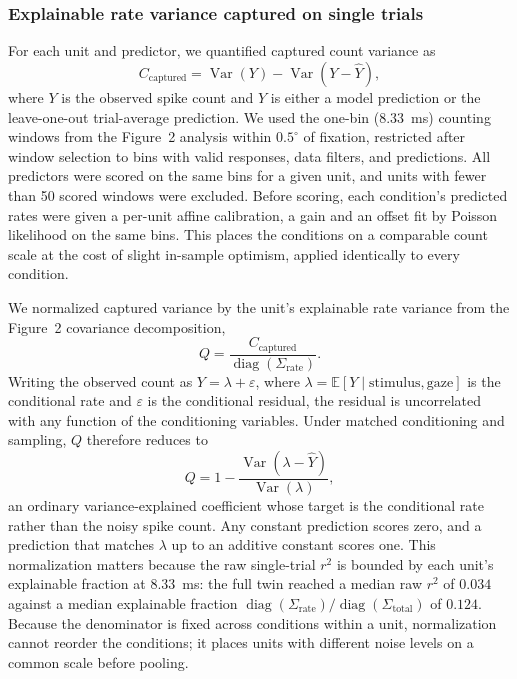 \documentclass{lite}
\begin{document}
\subsubsection{Explainable rate variance captured on single trials}
For each unit and predictor, we quantified captured count variance as
\begin{equation}
C_{\mathrm{captured}}
=
\operatorname{Var}(Y)-\operatorname{Var}(Y-\hat{Y}),
\end{equation}
where $Y$ is the observed spike count and $\hat{Y}$ is either a model prediction or the leave-one-out trial-average prediction. We used the one-bin ($8.33$~ms) counting windows from the Figure~2 analysis within $0.5^\circ$ of fixation, restricted after window selection to bins with valid responses, data filters, and predictions. All predictors were scored on the same bins for a given unit, and units with fewer than 50 scored windows were excluded. Before scoring, each condition's predicted rates were given a per-unit affine calibration, a gain and an offset fit by Poisson likelihood on the same bins. This places the conditions on a comparable count scale at the cost of slight in-sample optimism, applied identically to every condition.

We normalized captured variance by the unit's explainable rate variance from the Figure~2 covariance decomposition,
\begin{equation}
Q
=
\frac{C_{\mathrm{captured}}}
{\operatorname{diag}(\Sigma_{\mathrm{rate}})}.
\end{equation}
Writing the observed count as $Y = \lambda + \varepsilon$, where $\lambda = \mathbb{E}[Y \mid \text{stimulus}, \text{gaze}]$ is the conditional rate and $\varepsilon$ is the conditional residual, the residual is uncorrelated with any function of the conditioning variables. Under matched conditioning and sampling, $Q$ therefore reduces to
\begin{equation}
Q
=
1-\frac{\operatorname{Var}(\lambda-\hat{Y})}{\operatorname{Var}(\lambda)},
\end{equation}
an ordinary variance-explained coefficient whose target is the conditional rate rather than the noisy spike count. Any constant prediction scores zero, and a prediction that matches $\lambda$ up to an additive constant scores one. This normalization matters because the raw single-trial $r^2$ is bounded by each unit's explainable fraction at $8.33$~ms: the full twin reached a median raw $r^2$ of $0.034$ against a median explainable fraction $\operatorname{diag}(\Sigma_{\mathrm{rate}})/\operatorname{diag}(\Sigma_{\mathrm{total}})$ of $0.124$. Because the denominator is fixed across conditions within a unit, normalization cannot reorder the conditions; it places units with different noise levels on a common scale before pooling.
\end{document}
